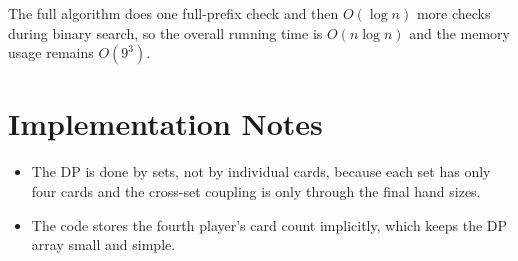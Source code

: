 \documentclass[11pt]{article}
\begin{document}
The full algorithm does one full-prefix check and then $O(\log n)$ more checks during binary
search, so the overall running time is $O(n \log n)$ and the memory usage remains $O(9^3)$.

\section*{Implementation Notes}

\begin{itemize}[leftmargin=*]
    \item The DP is done by sets, not by individual cards, because each set has only four cards and
    the cross-set coupling is only through the final hand sizes.
    \item The code stores the fourth player's card count implicitly, which keeps the DP array small and
    simple.
\end{itemize}
\end{document}
